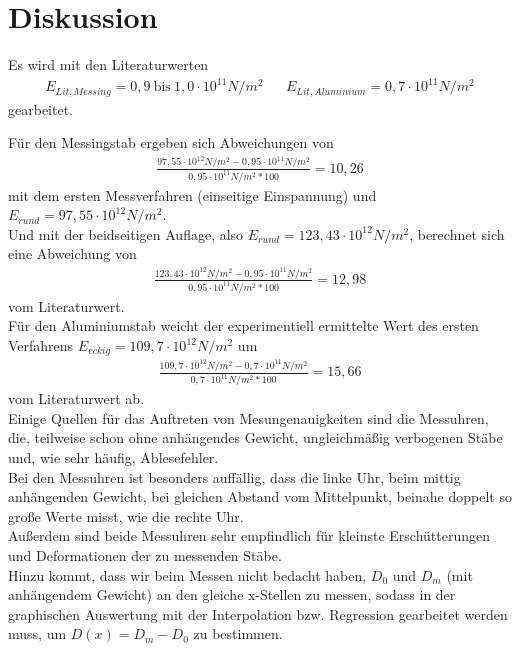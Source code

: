 \section{Diskussion}
\label{sec:Diskussion}



Es wird mit den Literaturwerten \cite{literaturwerte}
\begin{align*}
    E_{Lit, Messing} = 0,9 \: \textrm{bis} \: 1,0 \cdot 10^{11} N/m^2 && E_{Lit, Aluminium} = 0,7 \cdot 10^{11} N/m^2
\end{align*}
gearbeitet.

Für den Messingstab ergeben sich Abweichungen von 
\begin{align*}
    \frac{97,55 \cdot 10^{12} N/m^2 - 0,95 \cdot 10^{11} N/m^2}{0,95 \cdot 10^{11} N/m^2 * 100 } = 10,26
\end{align*}
mit dem ersten Messverfahren (einseitige Einspannung) und $E_{rund} = 97,55 \cdot 10^{12} N/m^2$.\\

Und mit der beidseitigen Auflage, also $E_{rund} = 123,43 \cdot 10^{12} N/m^2$, berechnet sich eine Abweichung von
\begin{align*}
    \frac{123,43 \cdot 10^{12} N/m^2 - 0,95 \cdot 10^{11} N/m^2}{0,95 \cdot 10^{11} N/m^2 * 100 } = 12,98
\end{align*}
vom Literaturwert.\\

Für den Aluminiumstab weicht der experimentiell ermittelte Wert des ersten Verfahrens $E_{eckig} = 109,7 \cdot 10^{12} N/m^2$ um
\begin{align*}
    \frac{109,7 \cdot 10^{12} N/m^2 - 0,7 \cdot 10^{11} N/m^2}{0,7 \cdot 10^{11} N/m^2 * 100 } = 15,66
\end{align*}
vom Literaturwert ab.\\

Einige Quellen für das Auftreten von Mesungenauigkeiten sind die Messuhren, die, teilweise 
schon ohne anhängendes Gewicht, ungleichmäßig verbogenen Stäbe und, wie sehr häufig, Ablesefehler.\\
Bei den Messuhren ist besonders auffällig, dass die linke Uhr, beim mittig anhängenden Gewicht, 
bei gleichen Abstand vom Mittelpunkt, beinahe doppelt so große Werte misst, wie die rechte Uhr.\\
Außerdem sind beide Messuhren sehr empfindlich für kleinste Erschütterungen und Deformationen der zu 
messenden Stäbe.\\
Hinzu kommt, dass wir beim Messen nicht bedacht haben, $D_0$ und $D_m$ (mit anhängendem Gewicht)
an den gleiche x-Stellen zu messen, sodass in der graphischen Auswertung mit der Interpolation 
bzw. Regression gearbeitet werden muss, um $D(x) = D_m - D_0$ zu bestimmen.